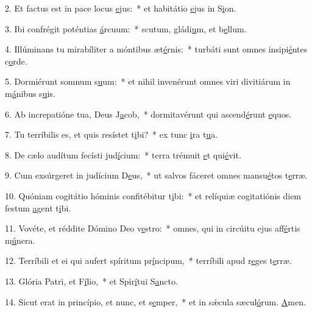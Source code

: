 2. Et factus est in pace locus \uline{e}jus:~* et habitátio \uline{e}jus in S\uline{i}on.\par 
3. Ibi confrégit poténtias \uline{á}rcuum:~* scutum, gládi\uline{u}m, et b\uline{e}llum.\par 
4. Illúminans tu mirabíliter a móntibus æt\uline{é}rnis:~* turbáti sunt omnes insipi\uline{é}ntes c\uline{o}rde.\par 
5. Dormiérunt somnum s\uline{u}um:~* et nihil invenérunt omnes viri divitiárum in m\uline{á}nibus s\uline{u}is.\par 
6. Ab increpatióne tua, Deus J\uline{a}cob,~* dormitavérunt qui ascend\uline{é}runt \uline{e}quos.\par 
7. Tu terríbilis es, et quis resístet t\uline{i}bi?~* ex tunc \uline{i}ra t\uline{u}a.\par 
8. De cælo audítum fecísti jud\uline{í}cium:~* terra trémuit \uline{e}t qui\uline{é}vit.\par 
9. Cum exsúrgeret in judícium D\uline{e}us,~* ut salvos fáceret omnes mansu\uline{é}tos t\uline{e}rræ.\par 
10. Quóniam cogitátio hóminis confitébitur t\uline{i}bi:~* et relíquiæ cogitatiónis diem festum \uline{a}gent t\uline{i}bi.\par 
11. Vovéte, et réddite Dómino Deo v\uline{e}stro:~* omnes, qui in circúitu ejus aff\uline{é}rtis m\uline{ú}nera.\par 
12. Terríbili et ei qui aufert spíritum pr\uline{í}ncipum,~* terríbili apud r\uline{e}ges t\uline{e}rræ.\par 
13. Glória Patri, et F\uline{í}lio,~* et Spir\uline{í}tui S\uline{a}ncto.\par 
14. Sicut erat in princípio, et nunc, et s\uline{e}mper,~* et in sǽcula sæcul\uline{ó}rum. \uline{A}men.\par 
